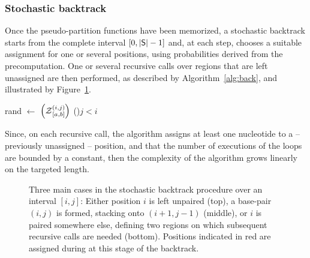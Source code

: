 \subsubsection{Stochastic backtrack}
Once the pseudo-partition functions have been memorized, a stochastic backtrack starts from the complete interval $[0,|\text{\sf S}|-1]$ and, at each step, chooses a suitable assignment for one or several positions, using probabilities derived from the precomputation. One or several recursive calls over regions that are left unassigned are then performed, as described by Algorithm~\ref{alg:back}, and illustrated by Figure~\ref{fig:stochastic}.
\begin{algorithm}[t]
\DontPrintSemicolon
	\SetAlgoLined
{}
	rand $\leftarrow$ \Random$\left(\Z{i,j}{a,b}\right)$\tcp*[r]{Draw random number in $[0,\Z{i,j}{a,b}[$}
 \lIf(){$j<i$}{\Return{$\varepsilon$}}
\caption{\protect\Backtrack$\left(i,j,a,b,\Target\right)$\label{alg:back}}
\end{algorithm}

Since, on each recursive call, the algorithm assigns at least one nucleotide to a -- previously unassigned -- position, and that the number of executions of the loops are bounded by a constant, then the complexity of the algorithm grows linearly on the targeted length. 

\begin{figure}
\resizebox{\textwidth}{!}{}
\caption{Three main cases in the stochastic backtrack procedure over an interval $[i,j]$: Either position $i$ is left unpaired (top), a base-pair $(i,j)$ is formed, stacking onto $(i+1,j-1)$ (middle), or $i$ is paired somewhere else, defining two regions on which subsequent recursive calls are needed (bottom). Positions indicated in red are assigned during at this stage of the backtrack.\label{fig:stochastic}}
\end{figure}


